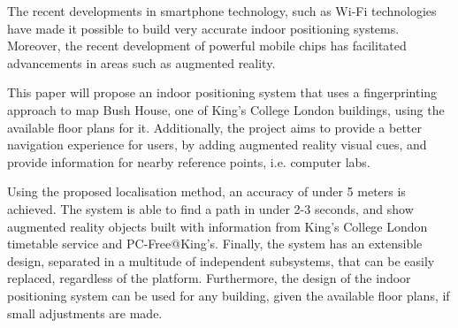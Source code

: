The recent developments in smartphone technology, such as Wi-Fi technologies have made it possible to build very accurate indoor positioning systems. Moreover, the recent development of powerful mobile chips has facilitated advancements in areas such as augmented reality.

This paper will propose an indoor positioning system that uses a fingerprinting approach to map Bush House, one of King's College London buildings, using the available floor plans for it. Additionally, the project aims to provide a better navigation experience for users, by adding augmented reality visual cues, and provide information for nearby reference points, i.e. computer labs.

Using the proposed localisation method, an accuracy of under 5 meters is achieved. The system is able to find a path in under 2-3 seconds, and show augmented reality objects built with information from King's College London timetable service and PC-Free@King's. Finally, the system has an extensible design, separated in a multitude of independent subsystems, that can be easily replaced, regardless of the platform. Furthermore, the design of the indoor positioning system can be used for any building, given the available floor plans, if small adjustments are made.